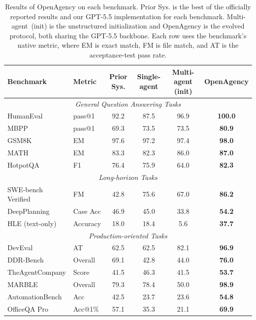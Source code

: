 \documentclass{article} %
\begin{document}
\begin{table}[t]
\caption{Results of OpenAgency on each benchmark. Prior Sys. is the best of the officially reported results and our GPT-5.5 implementation for each benchmark. Multi-agent~(init) is the unstructured initialization and OpenAgency is the evolved protocol, both sharing the GPT-5.5 backbone. Each row uses the benchmark's native metric, where EM is exact match, FM is file match, and AT is the acceptance-test pass rate.}
\label{tab:main}
\begin{center}
\small
\setlength{\tabcolsep}{5pt}
\begin{tabular}{llcccc}
\toprule
\textbf{Benchmark} & \textbf{Metric} & \textbf{Prior Sys.} & \textbf{Single-agent} & \textbf{Multi-agent (init)} & \textbf{OpenAgency} \\
\midrule
\multicolumn{6}{c}{\emph{General Question Answering Tasks}} \\
HumanEval & pass@1 & 92.2 & 87.5 & 96.9 & \textbf{100.0} \\
MBPP & pass@1 & 69.3 & 73.5 & 73.5 & \textbf{80.9} \\
GSM8K & EM & 97.6 & 97.2 & 97.4 & \textbf{98.0} \\
MATH & EM & 83.3 & 82.3 & 86.0 & \textbf{87.0} \\
HotpotQA & F1 & 76.4 & 75.9 & 64.0 & \textbf{82.3} \\
\midrule
\multicolumn{6}{c}{\emph{Long-horizon Tasks}} \\
SWE-bench Verified & FM & 42.8 & 75.6 & 67.0 & \textbf{86.2} \\
DeepPlanning & Case Acc & 46.9 & 45.0 & 33.8 & \textbf{54.2} \\
HLE (text-only) & Accuracy & 18.0 & 18.4 & 5.6 & \textbf{37.7} \\
\midrule
\multicolumn{6}{c}{\emph{Production-oriented Tasks}} \\
DevEval & AT & 62.5 & 62.5 & 82.1 & \textbf{96.9} \\
DDR-Bench & Overall & 69.1 & 42.8 & 44.0 & \textbf{76.0} \\
TheAgentCompany & Score & 41.5 & 46.3 & 41.5 & \textbf{53.7} \\
MARBLE & Overall & 79.3 & 78.4 & 50.0 & \textbf{98.9} \\
AutomationBench & Acc & 42.5 & 23.7 & 23.6 & \textbf{54.8} \\
OfficeQA Pro & Acc@1\% & 57.1 & 35.3 & 21.1 & \textbf{69.9} \\
\bottomrule
\end{tabular}
\end{center}
\vspace{-2mm}
\end{table}
\end{document}
